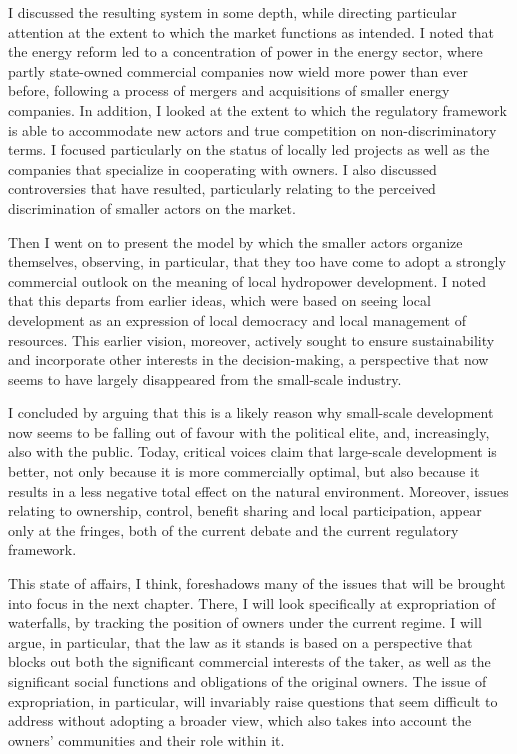 I discussed the resulting system in some depth, while directing particular attention at the extent to which the market functions as intended. I noted that the energy reform led to a concentration of power in the energy sector, where partly state-owned commercial companies now wield more power than ever before, following a process of mergers and acquisitions of smaller energy companies. In addition, I looked at the extent to which the regulatory framework is able to accommodate new actors and true competition on non-discriminatory terms. I focused particularly on the status of locally led projects as well as the companies that specialize in cooperating with owners. I also discussed controversies that have resulted, particularly relating to the perceived discrimination of smaller actors on the market.

Then I went on to present the model by which the smaller actors organize themselves, observing, in particular, that they too have come to adopt a strongly commercial outlook on the meaning of local hydropower development. I noted that this departs from earlier ideas, which were based on seeing local development as an expression of local democracy and local management of resources. This earlier vision, moreover, actively sought to ensure sustainability and incorporate other interests in the decision-making, a perspective that now seems to have largely disappeared from the small-scale industry.

I concluded by arguing that this is a likely reason why small-scale development now seems to be falling out of favour with the political elite, and, increasingly, also with the public. Today, critical voices claim that large-scale development is better, not only because it is more commercially optimal, but also because it results in a less negative total effect on the natural environment. Moreover, issues relating to ownership, control, benefit sharing and local participation, appear only at the fringes, both of the current debate and the current regulatory framework. 

This state of affairs, I think, foreshadows many of the issues that will be brought into focus in the next chapter. There, I will look specifically at expropriation of waterfalls, by tracking the position of owners under the current regime. I will argue, in particular, that the law as it stands is based on a perspective that blocks out both the significant commercial interests of the taker, as well as the significant social functions and obligations of the original owners. The issue of expropriation, in particular, will invariably raise questions that seem difficult to address without adopting a broader view, which also takes into account the owners' communities and their role within it.

